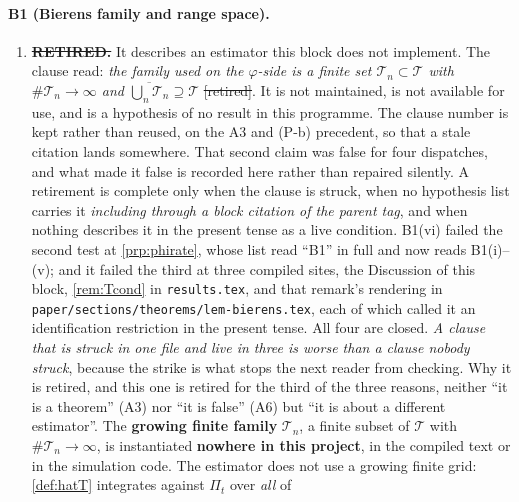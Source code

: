\paragraph{B1 (Bierens family and range space).}

\begin{enumerate}
\item[(vi)] \textbf{\sout{RETIRED.}} It describes an estimator this block
does not implement. The clause read: \emph{the family used on the $\varphi$-side is a finite set
$\mathcal T_n\subset\mathcal T$ with $\#\mathcal T_n\to\infty$ and
$\overline{\bigcup_n\mathcal T_n}\supseteq\mathcal T$} \sout{[retired]}. It is not maintained, is not
available for use, and is a hypothesis of no result in this programme. The clause number is kept
rather than reused, on the A3 and \textup{(P-b)} precedent, so that a stale citation lands
somewhere.
That second claim was false for four dispatches, and what made it false is recorded here rather than
repaired silently. A retirement is complete only when the clause is struck, when no hypothesis list carries
it \emph{including through a block citation of the parent tag}, and when nothing describes it in the present
tense as a live condition. B1(vi) failed the second test at \cref{prp:phirate}, whose list read ``B1'' in full
and now reads B1(i)--(v); and it failed the third at three compiled sites, the Discussion of this block,
\cref{rem:Tcond} in \texttt{results.tex}, and that remark's rendering in
\texttt{paper/sections/theorems/lem-bierens.tex}, each of which called it an identification restriction in
the present tense. All four are closed. \emph{A clause that is struck in one file and live in three is worse
than a clause nobody struck}, because the strike is what stops the next reader from checking.
Why it is retired, and this one is retired for the third of the three reasons, neither
``it is a theorem'' \textup{(A3)} nor ``it is false'' \textup{(A6)} but ``it is about a different
estimator''. The \textbf{growing finite family} $\mathcal T_n$, a finite subset of $\mathcal T$
with $\#\mathcal T_n\to\infty$, is instantiated \textbf{nowhere in this project}, in the compiled text
or in the simulation code. The
estimator does not use a growing finite grid: \cref{def:hatT} integrates against $\Pi_t$ over \emph{all} of

\end{enumerate}
